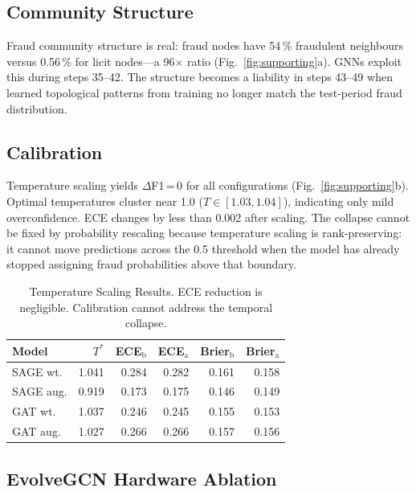 \documentclass[journal,10pt,twoside]{IEEEtran}
\begin{document}
\subsection{Community Structure}

Fraud community structure is real: fraud nodes have 54\,\% fraudulent
neighbours versus 0.56\,\% for licit nodes---a 96$\times$ ratio
(Fig.~\ref{fig:supporting}a). GNNs exploit this during steps 35--42.
The structure becomes a liability in steps 43--49 when learned
topological patterns from training no longer match the test-period
fraud distribution.

\subsection{Calibration}

Temperature scaling yields $\Delta$F1\,=\,0 for all configurations
(Fig.~\ref{fig:supporting}b). Optimal temperatures cluster near 1.0
($T \in [1.03, 1.04]$), indicating only mild overconfidence. ECE
changes by less than 0.002 after scaling. The collapse cannot be
fixed by probability rescaling because temperature scaling is
rank-preserving: it cannot move predictions across the 0.5 threshold
when the model has already stopped assigning fraud probabilities above
that boundary.

\begin{table}[!t]
\centering
\caption{Temperature Scaling Results. ECE reduction is negligible.
  Calibration cannot address the temporal collapse.}
\label{tab:calibration}
\footnotesize
\begin{tabular}{lrrrrr}
\toprule
\textbf{Model} & $T^*$ & \textbf{ECE$_\text{b}$}
  & \textbf{ECE$_\text{a}$} & \textbf{Brier$_\text{b}$}
  & \textbf{Brier$_\text{a}$} \\
\midrule
SAGE wt.   & 1.041 & 0.284 & 0.282 & 0.161 & 0.158 \\
SAGE aug.  & 0.919 & 0.173 & 0.175 & 0.146 & 0.149 \\
GAT wt.    & 1.037 & 0.246 & 0.245 & 0.155 & 0.153 \\
GAT aug.   & 1.027 & 0.266 & 0.266 & 0.157 & 0.156 \\
\bottomrule
\end{tabular}
\end{table}

\subsection{EvolveGCN Hardware Ablation}
\end{document}
